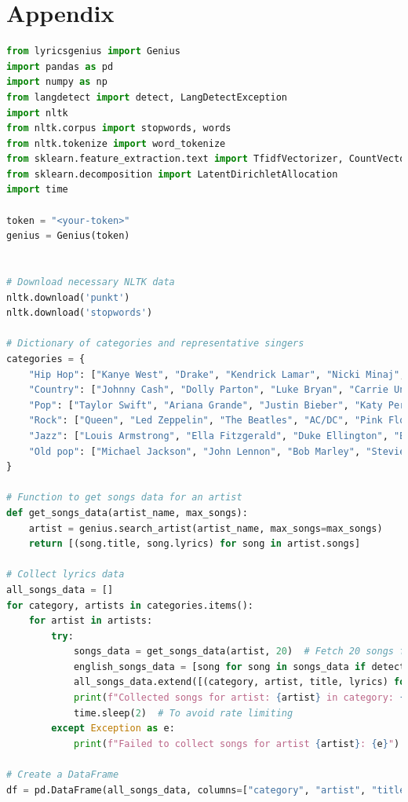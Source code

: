 \documentclass{article}
\begin{document}
\section*{Appendix}
\begin{lstlisting}[language=Python]
from lyricsgenius import Genius
import pandas as pd
import numpy as np
from langdetect import detect, LangDetectException
import nltk 
from nltk.corpus import stopwords, words
from nltk.tokenize import word_tokenize
from sklearn.feature_extraction.text import TfidfVectorizer, CountVectorizer
from sklearn.decomposition import LatentDirichletAllocation
import time

token = "<your-token>"
genius = Genius(token)


# Download necessary NLTK data
nltk.download('punkt')
nltk.download('stopwords')

# Dictionary of categories and representative singers
categories = {
    "Hip Hop": ["Kanye West", "Drake", "Kendrick Lamar", "Nicki Minaj", "Cardi B"],
    "Country": ["Johnny Cash", "Dolly Parton", "Luke Bryan", "Carrie Underwood", "Blake Shelton"],
    "Pop": ["Taylor Swift", "Ariana Grande", "Justin Bieber", "Katy Perry", "Lady Gaga"],
    "Rock": ["Queen", "Led Zeppelin", "The Beatles", "AC/DC", "Pink Floyd"],
    "Jazz": ["Louis Armstrong", "Ella Fitzgerald", "Duke Ellington", "Billie Holiday", "Miles Davis"],
    "Old pop": ["Michael Jackson", "John Lennon", "Bob Marley", "Stevie Wonder", "U2"]
}

# Function to get songs data for an artist
def get_songs_data(artist_name, max_songs):
    artist = genius.search_artist(artist_name, max_songs=max_songs)
    return [(song.title, song.lyrics) for song in artist.songs]

# Collect lyrics data
all_songs_data = []
for category, artists in categories.items():
    for artist in artists:
        try:
            songs_data = get_songs_data(artist, 20)  # Fetch 20 songs for each artist
            english_songs_data = [song for song in songs_data if detect(song[1]) == 'en']
            all_songs_data.extend([(category, artist, title, lyrics) for title, lyrics in english_songs_data])
            print(f"Collected songs for artist: {artist} in category: {category}")
            time.sleep(2)  # To avoid rate limiting
        except Exception as e:
            print(f"Failed to collect songs for artist {artist}: {e}")

# Create a DataFrame
df = pd.DataFrame(all_songs_data, columns=["category", "artist", "title", "lyrics"])


\end{lstlisting}
\end{document}
